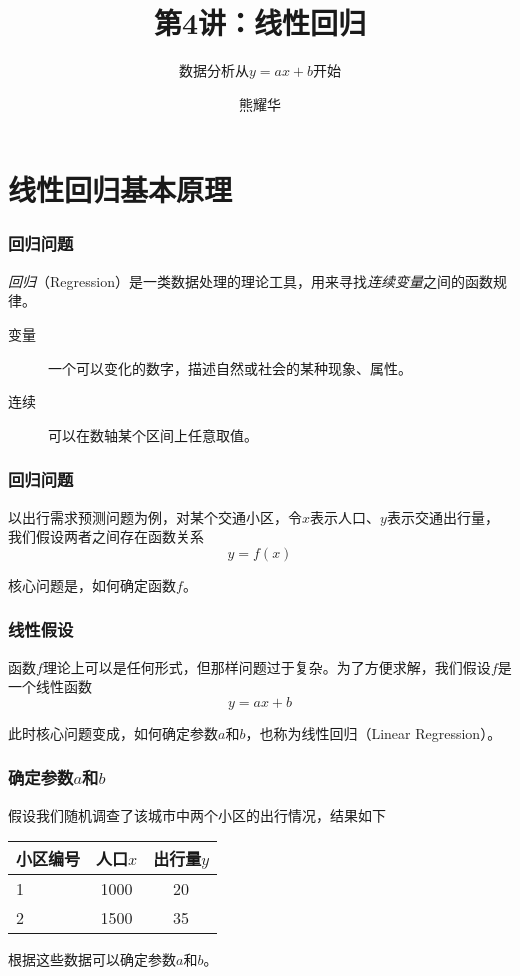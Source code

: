 \documentclass[14pt]{beamer}
\title{第4讲：线性回归}
\subtitle{数据分析从$y=ax+b$开始}
\author{熊耀华}
\institute{交通工程系}
\begin{document}
\begin{frame}
    \titlepage
\end{frame}

\section{线性回归基本原理}

\begin{frame}
    \frametitle{回归问题}

    \emph{回归}（Regression）是一类数据处理的理论工具，用来寻找\emph{连续变量}之间的函数规律。

    \begin{description}
        \item[变量] 一个可以变化的数字，描述自然或社会的某种现象、属性。
        \item[连续] 可以在数轴某个区间上任意取值。
    \end{description}
\end{frame}

\begin{frame}
    \frametitle{回归问题}
    以出行需求预测问题为例，对某个交通小区，令$x$表示人口、$y$表示交通出行量，我们假设两者之间存在函数关系
        \[ y = f(x) \]

    核心问题是，如何确定函数$f$。
\end{frame}

\begin{frame}
    \frametitle{线性假设}
    函数$f$理论上可以是任何形式，但那样问题过于复杂。为了方便求解，我们假设$f$是一个线性函数
    \[y=ax+b\]

    此时核心问题变成，如何确定参数$a$和$b$，也称为线性回归（Linear Regression）。
\end{frame}

\begin{frame}
    \frametitle{确定参数$a$和$b$}
    假设我们随机调查了该城市中两个小区的出行情况，结果如下
    \begin{table}
        \begin{tabular}{l c c}
            小区编号 & 人口$x$ & 出行量$y$ \\
            \hline\hline
            1   & 1000  & 20 \\
            2   & 1500  & 35 \\
            
        \end{tabular}
    \end{table}

    根据这些数据可以确定参数$a$和$b$。
\end{frame}
\end{document}
